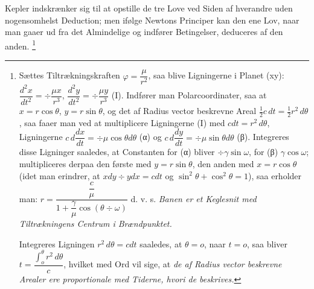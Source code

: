 \documentclass[12pt,a4paper]{book}
\begin{document}
Kepler indskrænker sig til at opstille de tre Love ved Siden af
hverandre uden nogensomhelst Deduction; men ifølge Newtons Principer
kan den ene Lov, naar man gaaer ud fra det Almindelige og indfører
Betingelser, deduceres af den anden.%
\footnote{%
Sættes Tiltrækningskraften $\varphi = \dfrac{\mu}{r^{2}}$, saa blive
Ligningerne i Planet (xy):
$\dfrac{d^{2}x}{dt^{2}} = \div \dfrac{\mu x}{r^{3}}$,
$\dfrac{d^{2}y}{dt^{2}} = \div \dfrac{\mu y}{r^{3}}$ (I).
Indfører man Polarcoordinater, saa at $x = r \cos \theta $, $y = r \sin \theta $,
og det af Radius vector beskrevne Areal
$\tfrac{1}{2} c\, dt = \tfrac{1}{2} r^{2}\, d\theta $, saa faaer man ved at
multiplicere Ligningerne (I) med $cdt = r^{2}\, d\theta $, Ligningerne
$c\, d \dfrac{dx}{dt} = \div \mu \cos \theta d\theta $ (α) og
$c\, d \dfrac{dy}{dt} = \div \mu \sin \theta d\theta $ (β).
Integreres disse Ligninger saaledes, at Constanten for (α) bliver
$\div \gamma \sin \omega $, for (β) $\gamma \cos \omega $; multipliceres derpaa den første
med $y = r \sin \theta $, den anden med $x = r \cos \theta $ (idet man erindrer,
at $xdy \div ydx = cdt$ og $\sin^{2} \theta + \cos^{2} \theta = 1$), saa
erholder man:
$r = \dfrac{\dfrac{c}{\mu}}{1 + \dfrac{\gamma}{\mu} \cos (\theta \div \omega)}$
d. v. s. \emph{Banen er et Keglesnit med Tiltrækningens Centrum i
Brændpunktet.}

Integreres Ligningen $r^{2}\, d\theta = cdt$ saaledes, at $\theta = o$, naar
$t = o$, saa bliver $t = \dfrac{\displaystyle\int_{o}^{\theta} r^{2}\, d\theta}{c}$,
hvilket med Ord vil sige, at \emph{de af Radius vector beskrevne
Arealer ere proportionale med Tiderne, hvori de beskrives.}

}
\end{document}
